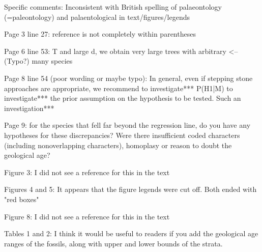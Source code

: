 \documentclass[11pt]{article}
\begin{document}
Specific comments:
Inconsistent with British spelling of palaeontology (=paleontology) and palaentological in text/figures/legends

Page 3 line 27: reference is not completely within parentheses

Page 6 line 53: T and large d, we obtain very large trees with arbitrary <--(Typo?) many species

Page 8 line 54 (poor wording or maybe typo): In general, even if stepping stone approaches are appropriate, we recommend to investigate*** P(H1|M) to investigate*** the prior assumption on the hypothesis to be tested. Such an investigation***

Page 9: for the species that fell far beyond the regression line, do you have any hypotheses for these discrepancies? Were there insufficient coded characters (including nonoverlapping characters), homoplasy or reason to doubt the geological age?

Figure 3: I did not see a reference for this in the text

Figures 4 and 5: It appears that the figure legends were cut off. Both ended with "red boxes"

Figure 8: I did not see a reference for this in the text

Tables 1 and 2: I think it would be useful to readers if you add the geological age ranges of the fossils, along with upper and lower bounds of the strata.




\end{document}
